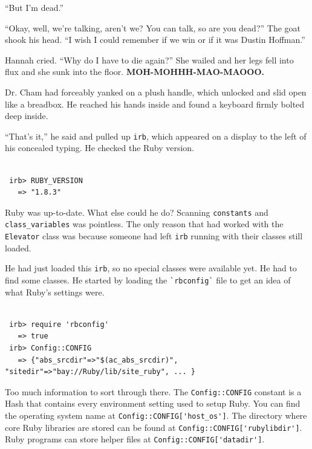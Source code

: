\documentclass[10pt,twoside]{report}
\begin{document}
``But I'm dead.''

``Okay, well, we're talking, aren't we?  You can talk, so are you
dead?''  The goat shook his head. ``I wish I could remember if we win
or if it was Dustin Hoffman.''

Hannah cried.  ``Why do I have to die again?''  She wailed and her
legs fell into flux and she sunk into the floor.  {\bf
  MOH-MOHHH-MAO-MAOOO.}

Dr. Cham had forceably yanked on a plush handle, which unlocked and
slid open like a breadbox. He reached his hands inside and found a
keyboard firmly bolted deep inside.

``That's it,'' he said and pulled up \lstinline[breaklines=true]|irb|,
which appeared on a display to the left of his concealed typing.  He
checked the Ruby version.


\begin{lstlisting}

 irb> RUBY_VERSION
   => "1.8.3"

\end{lstlisting}


Ruby was up-to-date.  What else could he do?  Scanning
\lstinline[breaklines=true]|constants| and
\lstinline[breaklines=true]|class_variables| was pointless. The only
reason that had worked with the \lstinline[breaklines=true]|Elevator|
class was because someone had left \lstinline[breaklines=true]|irb|
running with their classes still loaded.

He had just loaded this \lstinline[breaklines=true]|irb|, so no
special classes were available yet.  He had to find some classes. He
started by loading the \lstinline[breaklines=true]|`rbconfig`| file to
get an idea of what Ruby's settings were.


\begin{lstlisting}

 irb> require 'rbconfig'
   => true
 irb> Config::CONFIG
   => {"abs_srcdir"=>"$(ac_abs_srcdir)", "sitedir"=>"bay://Ruby/lib/site_ruby", ... }

\end{lstlisting}


Too much information to sort through there.  The
\lstinline[breaklines=true]|Config::CONFIG| constant is a Hash that
contains every environment setting used to setup Ruby.  You can find
the operating system name at
\lstinline[breaklines=true]|Config::CONFIG['host_os']|.  The directory
where core Ruby libraries are stored can be found at
\lstinline[breaklines=true]|Config::CONFIG['rubylibdir']|.  Ruby
programs can store helper files at
\lstinline[breaklines=true]|Config::CONFIG['datadir']|.
\end{document}
